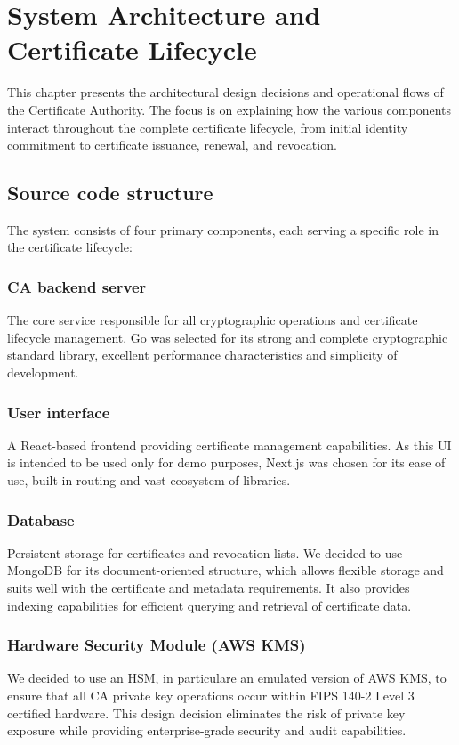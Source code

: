 \chapter{System Architecture and Certificate Lifecycle}
\label{Architecture}

This chapter presents the architectural design decisions and  operational flows 
of the Certificate Authority. The focus is on explaining how the various 
components interact throughout the complete certificate lifecycle, from initial 
identity commitment to certificate issuance, renewal, and revocation.


\section{Source code structure}

The system consists of four primary components, each serving a specific role in 
the certificate lifecycle:

\subsection{CA backend server} 
The core service responsible for all cryptographic operations and certificate 
lifecycle management. Go was selected for its strong and complete cryptographic standard library, 
excellent performance characteristics and simplicity of development.

\subsection{User interface}
A React-based frontend providing certificate management capabilities. As this UI is intended 
to be used only for demo purposes, Next.js was chosen for its ease of use, built-in routing 
and vast ecosystem of libraries.

\subsection{Database}
Persistent storage for certificates and revocation lists. We decided to use MongoDB for its
document-oriented structure, which allows flexible storage and suits well with the certificate and 
metadata requirements. It also provides indexing capabilities for efficient 
querying and retrieval of certificate data.

\subsection{Hardware Security Module (AWS KMS)}
We decided to use an HSM, in particulare an emulated version of AWS KMS, to ensure that all CA 
private key operations occur within FIPS 140-2 Level 3 certified hardware. 
This design decision eliminates the risk of private key exposure while providing 
enterprise-grade security and audit capabilities.


